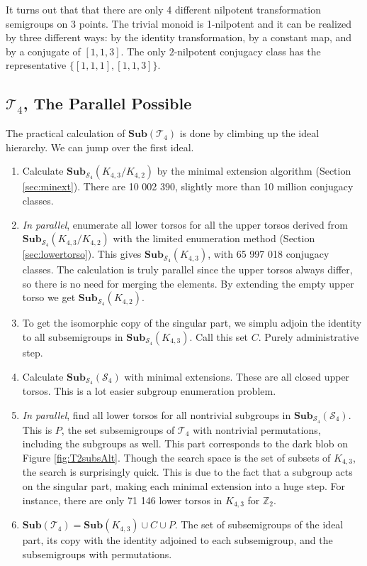 \documentclass{amsart}
\newcommand{\cT}{{\mathcal T}}
\newcommand{\cS}{{\mathcal S}}
\newcommand{\Sub}{\mathbf{Sub}}
\theoremstyle{plain}
\theoremstyle{definition}
\begin{document}
It turns out that that there are only 4 different nilpotent transformation semigroups on 3 points.
The trivial monoid is 1-nilpotent and it can be realized by three different ways: by the identity transformation, by a constant map, and by a conjugate of $[1,1,3]$.
The only $2$-nilpotent conjugacy class has the representative $\{[1,1,1],[1,1,3]\}$.

\subsection{$\cT_4$, The Parallel Possible }

The practical calculation of  $\Sub(\cT_4)$ is done by climbing up the ideal hierarchy.
We can jump over the first ideal.

\begin{enumerate}
\item Calculate $\Sub_{\cS_4}(K_{4,3}/K_{4,2})$ by the minimal extension algorithm (Section \ref{sec:minext}). There are 10 002 390, slightly more than 10 million conjugacy classes.  
\item \emph{In parallel}, enumerate all lower torsos for all the upper torsos derived from  $\Sub_{\cS_4}(K_{4,3}/K_{4,2})$ with the limited enumeration method (Section \ref{sec:lowertorso}). This gives $\Sub_{\cS_4}(K_{4,3})$, with  65 997 018 conjugacy classes. The calculation is truly parallel since the upper torsos always differ, so there is no need for merging the elements. By extending the empty upper torso we get $\Sub_{\cS_4}(K_{4,2})$.
\item To get the isomorphic copy of the singular part, we simplu adjoin the identity to all subsemigroups in $\Sub_{\cS_4}(K_{4,3})$. Call this set $C$.
Purely administrative step.
\item Calculate $\Sub_{\cS_4}(\cS_4)$ with minimal extensions. These are all closed upper torsos. This is a lot easier subgroup enumeration problem.
\item \emph{In parallel}, find all lower torsos for all nontrivial subgroups in $\Sub_{\cS_4}(\cS_4)$. This  is $P$, the set subsemigroups of $\cT_4$ with nontrivial permutations, including the subgroups as well. This part corresponds to the dark blob on Figure \ref{fig:T2subsAlt}.
Though the search space is the set of subsets of $K_{4,3}$, the search is surprisingly quick.
This is due to the fact that a subgroup acts on the singular part, making each minimal extension into a huge step.
For instance, there are only 71 146 lower torsos in $K_{4,3}$ for $\mathbb{Z}_2$.
\item $\Sub(\cT_4)=\Sub(K_{4,3})\cup C \cup P$. The set of subsemigroups of the ideal part, its copy with the identity adjoined to each subsemigroup, and the subsemigroups with permutations.
\end{enumerate}
\end{document}
